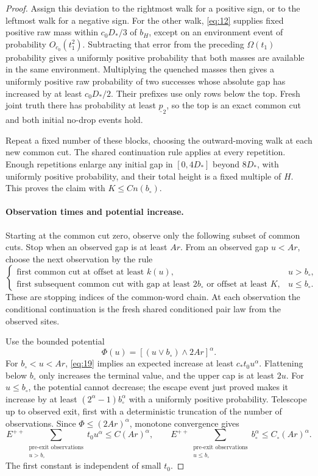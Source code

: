 \begin{proof}
Assign this deviation to the rightmost walk for a positive sign, or
to the leftmost walk for a negative sign. For the other walk,
\eqref{eq:12} supplies fixed positive raw mass within
\(c_0D_*/3\) of \(b_H\), except on an environment event of probability
\(O_{c_0}(t_1^2)\). Subtracting that error from the preceding
\(\Omega(t_1)\) probability gives a uniformly positive probability
that both masses are available in the same environment. Multiplying
the quenched masses then gives a uniformly positive raw probability
of two successes whose absolute gap has increased by at least
\(c_0D_*/2\). Their prefixes use only rows below the top. Fresh joint
truth there has probability at least \(\underline p_2\), so the top
is an exact common cut and both initial no-drop events hold.

Repeat a fixed number of these blocks, choosing the outward-moving
walk at each new common cut. The shared continuation rule applies at
every repetition. Enough repetitions enlarge any initial gap in
\([0,4D_*]\) beyond \(8D_*\), with uniformly positive probability,
and their total height is a fixed multiple of \(H\). This proves the
claim with \(K\le Cn(b_\circ)\).

\paragraph{Observation times and potential increase.}
Starting at the common cut zero, observe only the following subset of
common cuts. Stop when an observed gap is at least \(Ar\). From an
observed gap \(u<Ar\), choose the next observation by the rule
\[
\begin{cases}
\text{first common cut at offset at least }k(u),&u>b_\circ,\\
\text{first subsequent common cut with gap at least }2b_\circ
\text{ or offset at least }K,&u\le b_\circ.
\end{cases}
\]
These are stopping indices of the common-word chain. At each observation
the conditional continuation is the fresh shared conditioned pair law
from the observed sites.

Use the bounded potential
\[
\Phi(u)=[(u\vee b_\circ)\wedge2Ar]^\alpha.
\]
For \(b_\circ<u<Ar\), \eqref{eq:19} implies an expected increase at
least \(c_*t_0u^\alpha\). Flattening below \(b_\circ\) only increases
the terminal value, and the upper cap is at least \(2u\). For
\(u\le b_\circ\), the potential cannot decrease; the escape event
just proved makes it increase by at least
\((2^\alpha-1)b_\circ^\alpha\) with a uniformly positive probability.
Telescope up to observed exit, first with a deterministic truncation
of the number of observations. Since \(\Phi\le(2Ar)^\alpha\),
monotone convergence gives
\[
E^{++}\sum_{\substack{\text{pre-exit observations}\\u>b_\circ}}
 t_0u^\alpha\le C(Ar)^\alpha,
\qquad
E^{++}\sum_{\substack{\text{pre-exit observations}\\u\le b_\circ}}
 b_\circ^\alpha\le C_\circ(Ar)^\alpha.
\]
The first constant is independent of small \(t_0\).


\end{proof}
